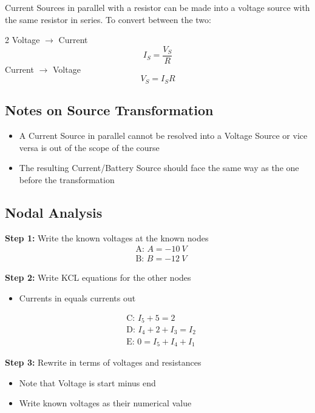 \documentclass{template}
\begin{document}
Current Sources in parallel with a resistor can be made into a voltage source with the same resistor in series. To convert between the two:

\begin{multicols} {2}
\centering
Voltage $\rightarrow$ Current \[I_S = \frac{V_S}{R}\]
Current $\rightarrow$ Voltage \[V_S = I_SR\]
\end{multicols}

\subsection*{Notes on Source Transformation} %
\begin {itemize}
    \item A Current Source in parallel cannot be resolved into a Voltage Source or vice versa is out of the scope of the course
    \item The resulting Current/Battery Source should face the same way as the one before the transformation
\end{itemize}

\newpage
\subsection{Nodal Analysis} %


\textbf{Step 1:} Write the known voltages at the known nodes %
\begin{align*}
    &\text{A: } A = -10 \: V \\
    &\text{B: } B = -12 \: V
\end{align*}

\textbf{Step 2:} Write KCL equations for the other nodes %
\begin{itemize}
    \item Currents in equals currents out
\end{itemize}
\begin{align*}
    &\text{C: } I_5 + 5 = 2 \\
    &\text{D: } I_4 + 2 + I_3 = I_2 \\
    &\text{E: } 0 = I_5 + I_4 + I_1
\end{align*}

\textbf{Step 3:} Rewrite in terms of voltages and resistances %
\begin{itemize}
    \item Note that Voltage is start minus end
    \item Write known voltages as their numerical value
\end{itemize}
\end{document}
